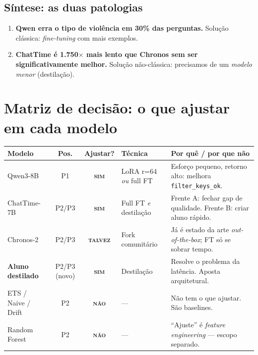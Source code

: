 \documentclass[11pt,a4paper]{article}
\newcommand{\code}[1]{\texttt{\small #1}}
\newcommand{\ok}{{\color{green!50!black}\textbf{\textsc{sim}}}}
\newcommand{\nope}{{\color{red!60!black}\textbf{\textsc{não}}}}
\newcommand{\maybe}{{\color{orange!70!black}\textbf{\textsc{talvez}}}}
\begin{document}
\subsection{Síntese: as duas patologias}

\begin{enumerate}[leftmargin=*]
\item \textbf{Qwen erra o tipo de violência em 30\% das perguntas.}
Solução clássica: \emph{fine-tuning} com mais exemplos.

\item \textbf{ChatTime é 1.750$\times$ mais lento que Chronos sem ser
significativamente melhor.} Solução não-clássica: precisamos de um
\emph{modelo menor} (destilação).
\end{enumerate}

\section{Matriz de decisão: o que ajustar em cada modelo}

\begin{table}[h!]
\centering
\small
\renewcommand{\arraystretch}{1.3}
\begin{tabularx}{\textwidth}{@{}l c c l X@{}}
\toprule
\textbf{Modelo} & \textbf{Pos.} & \textbf{Ajustar?} & \textbf{Técnica} & \textbf{Por quê / por que não} \\
\midrule
Qwen3-8B & P1 & \ok & LoRA r=64 \emph{ou} full FT
& Esforço pequeno, retorno alto: melhora \code{filter\_keys\_ok}. \\
\midrule
ChatTime-7B & P2/P3 & \ok & Full FT \emph{e} destilação
& Frente A: fechar gap de qualidade. Frente B: criar aluno rápido. \\
\midrule
Chronos-2 & P2/P3 & \maybe & Fork comunitário
& Já é estado da arte \emph{out-of-the-box}; FT só se sobrar tempo. \\
\midrule
\textbf{Aluno destilado} & P2/P3 (novo) & \ok & Destilação
& Resolve o problema da latência. Aposta arquitetural. \\
\midrule
ETS / Naive / Drift & P2 & \nope & ---
& Não tem o que ajustar. São baselines. \\
\midrule
Random Forest & P2 & \nope & ---
& ``Ajuste'' é \emph{feature engineering} --- escopo separado. \\
\bottomrule
\end{tabularx}
\end{table}
\end{document}
